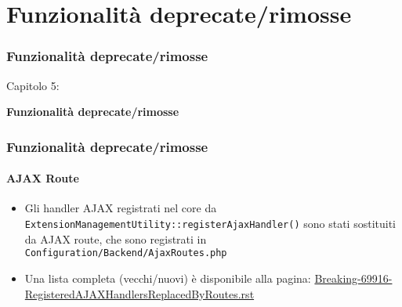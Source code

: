 %

\section{Funzionalità deprecate/rimosse}
\begin{frame}[fragile]
	\frametitle{Funzionalità deprecate/rimosse}

	\begin{center}\huge{Capitolo 5:}\end{center}
	\begin{center}\huge{\color{typo3darkgrey}\textbf{Funzionalità deprecate/rimosse}}\end{center}

\end{frame}


\begin{frame}[fragile]
	\frametitle{Funzionalità deprecate/rimosse}
	\framesubtitle{AJAX Route}

	\begin{itemize}

		\item Gli handler AJAX registrati nel core da
			\texttt{ExtensionManagementUtility::registerAjaxHandler()}
			sono stati sostituiti da AJAX route, che sono registrati in
			\texttt{ Configuration/Backend/AjaxRoutes.php}

		\item Una lista completa (vecchi/nuovi) è disponibile alla pagina:\newline
				\href{https://forge.typo3.org/projects/typo3cms-core/repository/revisions/3f0fb6229ba391356e5ed4984eb1c9418ba6663e/entry/typo3/sysext/core/Documentation/Changelog/master/Breaking-69916-RegisteredAJAXHandlersReplacedByRoutes.rst}{Breaking-69916-RegisteredAJAXHandlersReplacedByRoutes.rst}
	\end{itemize}

\end{frame}

